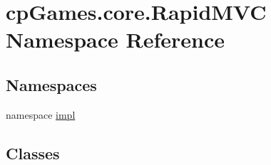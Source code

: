 \hypertarget{namespacecp_games_1_1core_1_1_rapid_m_v_c}{}\section{cp\+Games.\+core.\+Rapid\+M\+VC Namespace Reference}
\label{namespacecp_games_1_1core_1_1_rapid_m_v_c}
\subsection*{Namespaces}
\begin{DoxyCompactItemize}
\item 
namespace \mbox{\hyperlink{namespacecp_games_1_1core_1_1_rapid_m_v_c_1_1impl}{impl}}
\end{DoxyCompactItemize}
\subsection*{Classes}
